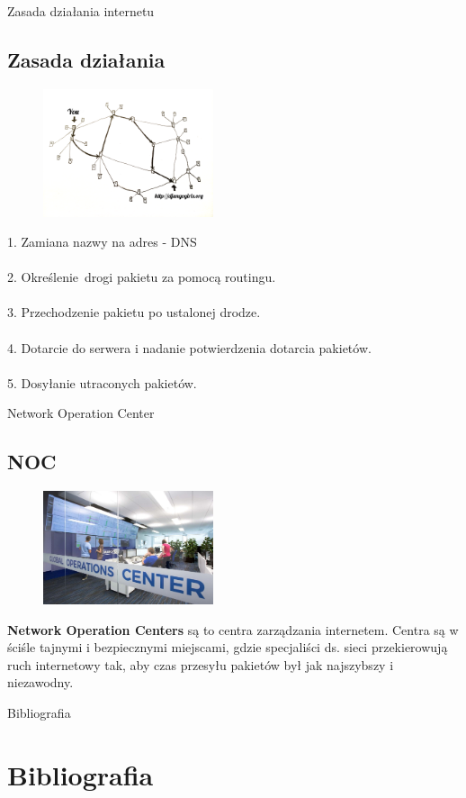 \documentclass{beamer}
\begin{document}
	\begin{frame}{Zasada działania internetu}
		\subsection{Zasada działania}
		\begin{figure}
			\vspace{-10pt}
			\includegraphics[width=5cm]{internet_2.png}
		\end{figure}
			1. Zamiana nazwy na adres - DNS \\ ~
			\\ 2. Określenie~drogi pakietu za pomocą routingu.\\ ~
			\\ 3. Przechodzenie pakietu po ustalonej drodze.\\ ~
			\\ 4. Dotarcie do serwera i nadanie potwierdzenia dotarcia pakietów.\\ ~
			\\ 5. Dosyłanie utraconych pakietów.
	\end{frame}
	\begin{frame}{Network Operation Center}
		\subsection{NOC}
		\begin{figure}
			\includegraphics[width=5cm]{noc.jpg}
		\end{figure}
		\textbf{Network Operation Centers} są to centra zarządzania internetem. Centra są w ściśle tajnymi i bezpiecznymi miejscami, gdzie specjaliści ds. sieci przekierowują ruch internetowy tak, aby czas przesyłu pakietów był jak najszybszy i niezawodny. 
	\end{frame}

	\begin{frame}{Bibliografia}
	\section{Bibliografia}
	
	\end{frame}
\end{document}
